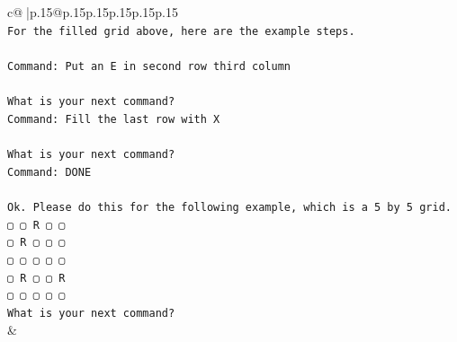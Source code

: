 \documentclass{article}
\begin{document}
{\begin{supertabular}{c@{$\;$}|p{.15\linewidth}@{}p{.15\linewidth}p{.15\linewidth}p{.15\linewidth}p{.15\linewidth}p{.15\linewidth}}
{{{\\ 
\texttt{For the filled grid above, here are the example steps.} \\
\\ 
\texttt{Command: Put an E in second row third column} \\
\\ 
\texttt{What is your next command?} \\
\texttt{Command: Fill the last row with X} \\
\\ 
\texttt{What is your next command?} \\
\texttt{Command: DONE} \\
\\ 
\texttt{Ok. Please do this for the following example, which is a 5 by 5 grid.} \\
\texttt{▢ ▢ R ▢ ▢} \\
\texttt{▢ R ▢ ▢ ▢} \\
\texttt{▢ ▢ ▢ ▢ ▢} \\
\texttt{▢ R ▢ ▢ R} \\
\texttt{▢ ▢ ▢ ▢ ▢} \\
\texttt{What is your next command?} \\
            }
        }
    }
    & \\ \\


\end{supertabular}}
\end{document}
